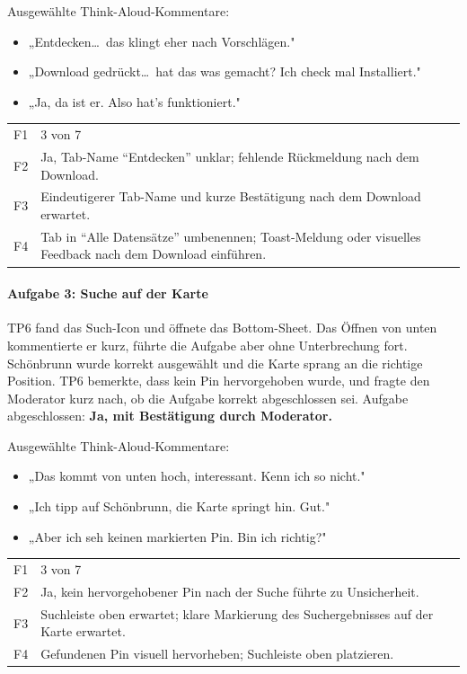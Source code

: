 \documentclass{article}
\begin{document}
Ausgewählte Think-Aloud-Kommentare:
\begin{itemize}
  \item „\glqq Entdecken\grqq\ldots\ das klingt eher nach Vorschlägen."
  \item „Download gedrückt\ldots\ hat das was gemacht? Ich check mal
        \glqq Installiert\grqq."
  \item „Ja, da ist er. Also hat's funktioniert."
\end{itemize}

\begin{tabular}{@{}lp{10cm}@{}}
  F1 & 3 von 7 \\
  F2 & Ja, Tab-Name \enquote{Entdecken} unklar; fehlende Rückmeldung
       nach dem Download. \\
  F3 & Eindeutigerer Tab-Name und kurze Bestätigung nach dem Download
       erwartet. \\
  F4 & Tab in \enquote{Alle Datensätze} umbenennen; Toast-Meldung oder
       visuelles Feedback nach dem Download einführen. \\
\end{tabular}

\paragraph{Aufgabe 3: Suche auf der Karte}

TP6 fand das Such-Icon und öffnete das Bottom-Sheet. Das Öffnen von
unten kommentierte er kurz, führte die Aufgabe aber ohne Unterbrechung
fort. Schönbrunn wurde korrekt ausgewählt und die Karte sprang an die
richtige Position. TP6 bemerkte, dass kein Pin hervorgehoben wurde,
und fragte den Moderator kurz nach, ob die Aufgabe korrekt
abgeschlossen sei.
Aufgabe abgeschlossen: \textbf{Ja, mit Bestätigung durch Moderator.}

Ausgewählte Think-Aloud-Kommentare:
\begin{itemize}
  \item „Das kommt von unten hoch, interessant. Kenn ich so nicht."
  \item „Ich tipp auf Schönbrunn, die Karte springt hin. Gut."
  \item „Aber ich seh keinen markierten Pin. Bin ich richtig?"
\end{itemize}

\begin{tabular}{@{}lp{10cm}@{}}
  F1 & 3 von 7 \\
  F2 & Ja, kein hervorgehobener Pin nach der Suche führte zu Unsicherheit. \\
  F3 & Suchleiste oben erwartet; klare Markierung des Suchergebnisses
       auf der Karte erwartet. \\
  F4 & Gefundenen Pin visuell hervorheben; Suchleiste oben platzieren. \\
\end{tabular}
\end{document}
